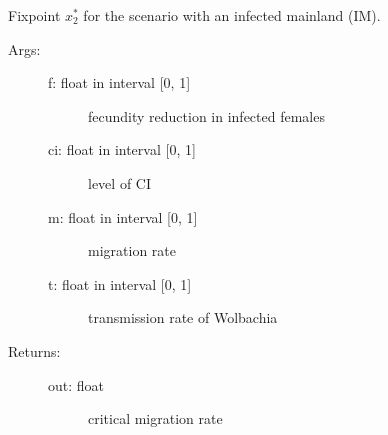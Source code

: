\documentclass[letterpaper,10pt,english]{sphinxmanual}
\begin{document}
\begin{fulllineitems}
\label{index:wspec.analytical.fix2_IM}
Fixpoint $x_2^{\ast}$ for the scenario with an infected mainland (IM).
\begin{description}
\item[{Args:}] \leavevmode\begin{description}
\item[{f: float in interval {[}0, 1{]}}] \leavevmode
fecundity reduction in infected females

\item[{ci: float in interval {[}0, 1{]}}] \leavevmode
level of CI

\item[{m: float in interval {[}0, 1{]}}] \leavevmode
migration rate

\item[{t: float in interval {[}0, 1{]}}] \leavevmode
transmission rate of Wolbachia

\end{description}

\item[{Returns:}] \leavevmode\begin{description}
\item[{out: float}] \leavevmode
critical migration rate

\end{description}

\end{description}

\end{fulllineitems}

\end{document}
